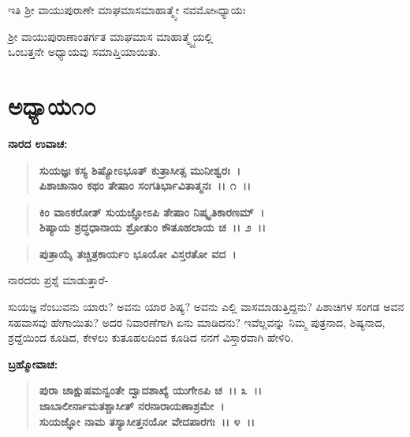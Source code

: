 \begin{center}
ಇತಿ ಶ‍್ರೀ ವಾಯುಪುರಾಣೇ ಮಾಘಮಾಸಮಾಹಾತ್ಮ್ಯೇ ನವಮೋsಧ್ಯಾಯಃ 
\end{center}

\begin{center}
ಶ‍್ರೀ ವಾಯುಪುರಾಣಾಂತರ್ಗತ ಮಾಘಮಾಸ ಮಾಹಾತ್ಮ್ಯೈಯಲ್ಲಿ \\ ಒಂಬತ್ತನೇ ಅಧ್ಯಾಯವು ಸಮಾಪ್ತಿಯಾಯಿತು.
\end{center}

\newpage

\section*{ಅಧ್ಯಾಯ\enginline{-}೧೦}

\begin{flushleft}
\textbf{ನಾರದ ಉವಾಚ:\enginline{-} }
\end{flushleft}

\begin{verse}
\textbf{ಸುಯಜ್ಞಃ ಕಸ್ಯ ಶಿಷ್ಯೋಽಭೂತ್ ಕುತ್ರಾಸೀತ್ಸ ಮುನೀಶ್ವರಃ~।}\\\textbf{ಪಿಶಾಚಾನಾಂ ಕಥಂ ತೇಷಾಂ ಸಂಗತಿರ್ಭಾವಿತಾತ್ಮನಃ~।। ೧~।। }
\end{verse}

\begin{verse}
\textbf{ಕಿಂ ವಾಽಕರೋತ್ ಸುಯಜ್ಞೋಽಪಿ ತೇಷಾಂ ನಿಷ್ಕೃತಿಕಾರಣಮ್~।}\\\textbf{ಶಿಷ್ಯಾಯ ಶ್ರದ್ಧಧಾನಾಯ ಶ್ರೋತುಂ ಕೌತೂಹಲಾಯ ಚ~।। ೨~।।}
\end{verse}

\begin{verse}
\textbf{ಪುತ್ರಾಯೈ ತಚ್ಚಿತ್ರಕಾರ್ಯಂ ಭೂಯೋ ವಿಸ್ತರತೋ ವದ~।}
\end{verse}

\begin{flushleft}
ನಾರದರು ಪ್ರಶ್ನೆ ಮಾಡುತ್ತಾರೆ-
\end{flushleft}

ಸುಯಜ್ಞ ನೆಂಬುವನು ಯಾರು? ಅವನು ಯಾರ ಶಿಷ್ಯ? ಅವನು ಎಲ್ಲಿ ವಾಸಮಾಡುತ್ತಿದ್ದನು? ಪಿಶಾಚಿಗಳ ಸಂಗಡ ಅವನ ಸಹವಾಸವು ಹೇಗಾಯಿತು? ಅದರ ನಿವಾರಣೆಗಾಗಿ ಏನು ಮಾಡಿದನು? ಇವೆಲ್ಲವನ್ನು ನಿಮ್ಮ ಪುತ್ರನಾದ, ಶಿಷ್ಯನಾದ, ಶ್ರದ್ದೆಯಿಂದ ಕೂಡಿದ, ಕೇಳಲು ಕುತೂಹಲದಿಂದ ಕೂಡಿದ ನನಗೆ ವಿಸ್ತಾರವಾಗಿ ಹೇಳಿರಿ.

\begin{flushleft}
\textbf{ಬ್ರಹ್ಮೋವಾಚ:\enginline{-}}
\end{flushleft}

\begin{verse}
\textbf{ಪುರಾ ಚಾಕ್ಷುಷಮನ್ವಂತೇ ದ್ವಾದಶಾಖ್ಯೆ ಯುಗೇಽಪಿ ಚ~।। ೩~।।}\\\textbf{ಜಾಬಾಲೀರ್ನಾಮತಶ್ಚಾಸೀತ್ ನರನಾರಾಯಣಾಶ್ರಮೇ~।}\\\textbf{ಸುಯಜ್ಞೋ ನಾಮ ತಸ್ಯಾಸೀತ್ತನಯೋ ವೇದಪಾರಗಃ~।। ೪~।।}
\end{verse}

